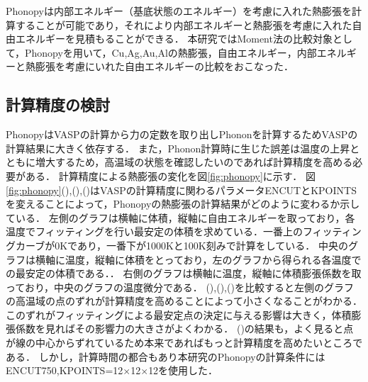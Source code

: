 Phonopyは内部エネルギー（基底状態のエネルギー）を考慮に入れた熱膨張を計算することが可能であり，それにより内部エネルギーと熱膨張を考慮に入れた自由エネルギーを見積もることができる．
本研究ではMoment法の比較対象として，Phonopyを用いて，Cu,Ag,Au,Alの熱膨張，自由エネルギー，内部エネルギーと熱膨張を考慮にいれた自由エネルギーの比較をおこなった．
\subsection{計算精度の検討}
PhonopyはVASPの計算から力の定数を取り出しPhononを計算するためVASPの計算結果に大きく依存する．
また，Phonon計算時に生じた誤差は温度の上昇とともに増大するため，高温域の状態を確認したいのであれば計算精度を高める必要がある．
計算精度による熱膨張の変化を図\ref{fig:phonopy}に示す．
図\ref{fig:phonopy}(),(),()はVASPの計算精度に関わるパラメータENCUTとKPOINTSを変えることによって，Phonopyの熱膨張の計算結果がどのように変わるか示している．
左側のグラフは横軸に体積，縦軸に自由エネルギーを取っており，各温度でフィッティングを行い最安定の体積を求めている．一番上のフィッティングカーブが0Kであり，一番下が1000Kと100K刻みで計算をしている．
中央のグラフは横軸に温度，縦軸に体積をとっており，左のグラフから得られる各温度での最安定の体積である．．
右側のグラフは横軸に温度，縦軸に体積膨張係数を取っており，中央のグラフの温度微分である．
(),(),()を比較すると左側のグラフの高温域の点のずれが計算精度を高めることによって小さくなることがわかる．
このずれがフィッティングによる最安定点の決定に与える影響は大きく，体積膨張係数を見ればその影響力の大きさがよくわかる．
()の結果も，よく見ると点が線の中心からずれているため本来であればもっと計算精度を高めたいところである．
しかし，計算時間の都合もあり本研究のPhonopyの計算条件にはENCUT750,KPOINTS=12$\times$12$\times$12を使用した．



